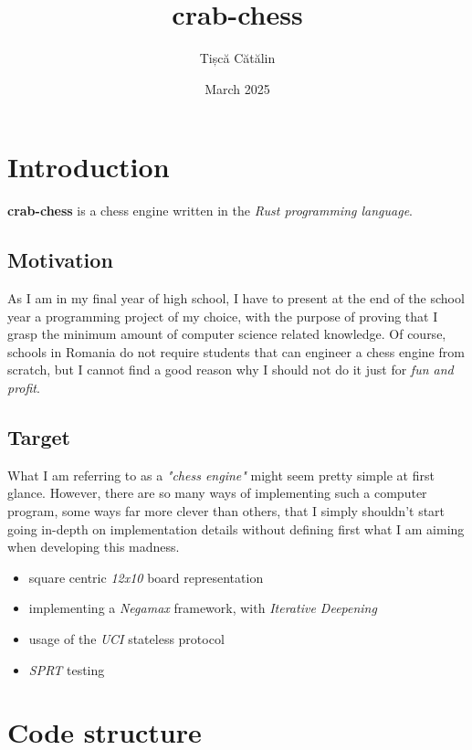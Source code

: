 \documentclass{article}
\title{crab-chess}
\author{Tișcă Cătălin}
\date{March 2025}
\begin{document}
\maketitle

\section{Introduction}

\textbf{crab-chess} is a chess engine written in the \textit{Rust programming language}.

\subsection{Motivation}
As I am in my final year of high school, I have to present at the end of the school year a programming project of my choice, with the purpose of proving that I grasp the minimum amount of computer science related knowledge. Of course, schools in Romania do not require students that can engineer a chess engine from scratch, but I cannot find a good reason why I should not do it just for \textit{fun and profit}.

\subsection{Target}
What I am referring to as a \textit{"chess engine"} might seem pretty simple at first glance. However, there are so many ways of implementing such a computer program, some ways far more clever than others, that I simply shouldn't start going in-depth on implementation details without defining first what I am aiming when developing this madness. 

\begin{itemize}
    \item square centric \textit{12x10} board representation
    \item implementing a \textit{Negamax} framework, with \textit{Iterative Deepening}
    \item usage of the \textit{UCI} stateless protocol
    \item \textit{SPRT} testing
\end{itemize}

\section{Code structure}
\end{document}
